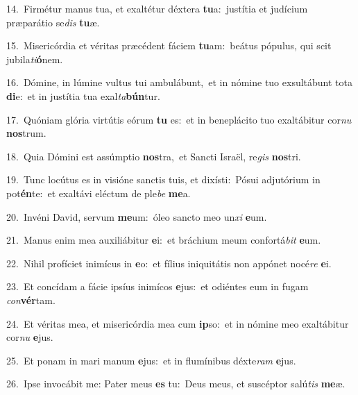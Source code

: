 {\numbfont\textcolor{\numbcolor}{14.}}~Firmétur manus tua, et exaltétur déxtera \textbf{tu}\-a:~\star justítia et judícium præparátio se\textit{dis} \textbf{tu}\-æ.\par
{\numbfont\textcolor{\numbcolor}{15.}}~Misericórdia et véritas præcédent fáciem \textbf{tu}\-am:~\star beátus pópulus, qui scit jubila\-\textit{ti}\-\textbf{ó}nem.\par
{\numbfont\textcolor{\numbcolor}{16.}}~Dómine, in lúmine vultus tui ambulábunt,~\dagger et in nómine tuo exsultábunt tota \textbf{di}\-e:~\star et in justítia tua exal\-\textit{ta}\-\textbf{bún}tur.\par
{\numbfont\textcolor{\numbcolor}{17.}}~Quóniam glória virtútis eórum \textbf{tu} es:~\star et in beneplácito tuo exaltábitur cor\textit{nu} \textbf{nos}\-trum.\par
{\numbfont\textcolor{\numbcolor}{18.}}~Quia Dómini est assúmptio \textbf{nos}\-tra,~\star et Sancti Israël, re\textit{gis} \textbf{nos}\-tri.\par
{\numbfont\textcolor{\numbcolor}{19.}}~Tunc locútus es in visióne sanctis tuis, et dixísti:~\dagger Pósui adjutórium in pot\-\textbf{én}\-te:~\star et exaltávi eléctum de ple\textit{be} \textbf{me}\-a.\par
{\numbfont\textcolor{\numbcolor}{20.}}~Invéni David, servum \textbf{me}\-um:~\star óleo sancto meo un\textit{xi} \textbf{e}\-um.\par
{\numbfont\textcolor{\numbcolor}{21.}}~Manus enim mea auxiliábitur \textbf{e}\-i:~\star et bráchium meum confortá\textit{bit} \textbf{e}\-um.\par
{\numbfont\textcolor{\numbcolor}{22.}}~Nihil profíciet inimícus in \textbf{e}\-o:~\star et fílius iniquitátis non appónet nocé\textit{re} \textbf{e}\-i.\par
{\numbfont\textcolor{\numbcolor}{23.}}~Et concídam a fácie ipsíus inimícos \textbf{e}\-jus:~\star et odiéntes eum in fugam \textit{con}\-\textbf{vér}tam.\par
{\numbfont\textcolor{\numbcolor}{24.}}~Et véritas mea, et misericórdia mea cum \textbf{ip}\-so:~\star et in nómine meo exaltábitur cor\textit{nu} \textbf{e}\-jus.\par
{\numbfont\textcolor{\numbcolor}{25.}}~Et ponam in mari manum \textbf{e}\-jus:~\star et in flumínibus déxte\textit{ram} \textbf{e}\-jus.\par
{\numbfont\textcolor{\numbcolor}{26.}}~Ipse invocábit me: Pater meus \textbf{es} tu:~\star Deus meus, et suscéptor salú\textit{tis} \textbf{me}\-æ.\par
